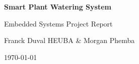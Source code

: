 \documentclass[12pt,a4paper]{article}
\begin{document}
\begin{titlepage}
    \centering
    \vspace*{1cm}
    {\huge \bfseries Smart Plant Watering System \par}
    \vspace{1cm}
    {\Large Embedded Systems Project Report \par}
    \vspace{2cm}
    {\large Franck Duval HEUBA \& Morgan Phemba \par}
    \vspace{2cm}
    \vfill
    {\large \today \par}
\end{titlepage}

\tableofcontents
\newpage


\newpage


\newpage


\newpage


\newpage


\newpage


\end{document}
